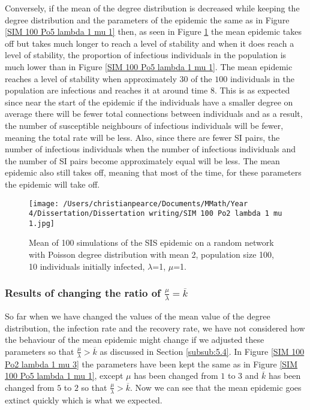 \documentclass{uonmathsreport}
\begin{document}
Conversely, if the mean of the degree distribution is decreased while keeping the degree distribution and the parameters of the epidemic the same as in Figure \ref{SIM 100 Po5 lambda 1 mu 1} then, as seen in Figure \ref{SIM 100 Po2 lambda 1 mu 1} the mean epidemic takes off but takes much longer to reach a level of stability and when it does reach a level of stability, the proportion of infectious individuals in the population is much lower than in Figure \ref{SIM 100 Po5 lambda 1 mu 1}. The mean epidemic reaches a level of stability when approximately $30$ of the $100$ individuals in the population are infectious and reaches it at around time $8$. This is as expected since near the start of the epidemic if the individuals have a smaller degree on average there will be fewer total connections between individuals and as a result, the number of susceptible neighbours of infectious individuals will be fewer, meaning the total rate will be less. Also, since there are fewer SI pairs, the number of infectious individuals when the number of infectious individuals and the number of SI pairs become approximately equal will be less. The mean epidemic also still takes off, meaning that most of the time, for these parameters the epidemic will take off.

\begin{figure}
\begin{center}
\texttt{[image: /Users/christianpearce/Documents/MMath/Year 4/Dissertation/Dissertation writing/SIM 100 Po2 lambda 1 mu 1.jpg]}
\end{center}
\caption{Mean of 100 simulations of the SIS epidemic on a random network with Poisson degree distribution with mean 2, population size 100, 10 individuals initially infected, $\lambda$=1, $\mu$=1.}
\label{SIM 100 Po2 lambda 1 mu 1}
\end{figure}

\subsubsection{Results of changing the ratio of $\frac{\mu}{\lambda}=\overline{k}$} \label{subsub:5.5.5}

So far when we have changed the values of the mean value of the degree distribution, the infection rate and the recovery rate, we have not considered how the behaviour of the mean epidemic might change if we adjusted these parameters so that $\frac{\mu}{\lambda}>\overline{k}$ as discussed in Section \ref{subsub:5.4}. In Figure \ref{SIM 100 Po2 lambda 1 mu 3} the parameters have been kept the same as in Figure \ref{SIM 100 Po5 lambda 1 mu 1}, except $\mu$ has been changed from $1$ to $3$ and $\overline{k}$ has been changed from $5$ to $2$ so that $\frac{\mu}{\lambda}>\overline{k}$. Now we can see that the mean epidemic goes extinct quickly which is what we expected.
\end{document}

